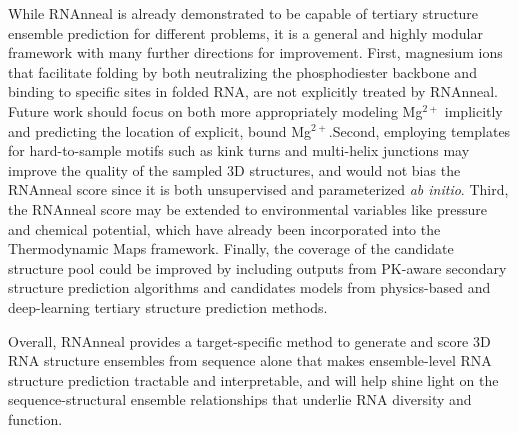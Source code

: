 \documentclass[%
aip,
 amsmath,amssymb,
reprint,%
twocolumn,
]{revtex4-1}
\begin{document}
{%
While RNAnneal is already demonstrated to be capable of tertiary structure ensemble prediction for different problems, it is a general and highly modular framework with many further directions for improvement. First, magnesium ions that facilitate folding by both neutralizing the phosphodiester backbone and binding to specific sites in folded RNA\cite{brion1997hierarchy}, are not explicitly treated by RNAnneal. Future work should focus on both more appropriately modeling Mg$^\mathrm{2+}$ implicitly and predicting the location of explicit, bound Mg$^\mathrm{2+}$.\cite{yamagami2021functional}Second, employing templates for hard-to-sample motifs such as kink turns and multi-helix junctions\cite{sarver2008fr3d,laing2009analysis,roll2016jar3d} may improve the quality of the sampled 3D structures, and would not bias the RNAnneal score since it is both unsupervised and parameterized {\it ab initio}. Third, the RNAnneal score may be extended to environmental variables like pressure and chemical potential, which have already been incorporated into the Thermodynamic Maps framework.\cite{lee2025exponentially} Finally, the coverage of the candidate structure pool could be improved by including outputs from PK-aware secondary structure prediction algorithms\cite{xu2014vfold,xu2015physics,kim2015computational,xiong2021pairing,li2023rnajp} and candidates models from physics-based\cite{xiong2021pairing,li2022vfold,li2023rnajp,watkins2018blind} and deep-learning \cite{abramson2024accurate,chai2024chai,wohlwend2025boltz, baek2024accurate} tertiary structure prediction methods.

Overall, RNAnneal provides a target-specific method to generate and score 3D RNA structure ensembles from sequence alone that makes ensemble-level RNA structure prediction tractable and interpretable, and will help shine light on the sequence-structural ensemble relationships that underlie RNA diversity and function.


}
\end{document}
